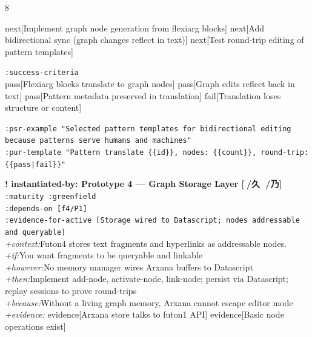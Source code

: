 \documentclass[landscape]{article}
\newcommand{\flexitag}[1]{\textcolor[gray]{0.35}{\textit{#1}}}
\newenvironment{devmapactive}{%
  \def\FrameCommand{\colorbox{devmapactivebg}}%
  \setlength{\fboxsep}{2pt}%
  \MakeFramed{\advance\hsize-\width \FrameRestore}%
}{\endMakeFramed}
\newenvironment{devmapgreenfield}{%
  \def\FrameCommand{\colorbox{devmapgreenfieldbg}}%
  \setlength{\fboxsep}{2pt}%
  \MakeFramed{\advance\hsize-\width \FrameRestore}%
}{\endMakeFramed}
\begin{document}
\begin{paracol}{8}
\begin{devmapactive}
    next[Implement graph node generation from flexiarg blocks] next[Add bidirectional sync (graph changes reflect in text)] next[Test round-trip editing of pattern templates]\\
\par
  \texttt{:\allowbreak{}success-\allowbreak{}criteria}\\
    pass[Flexiarg blocks translate to graph nodes] pass[Graph edits reflect back in text] pass[Pattern metadata preserved in translation] fail[Translation loses structure or content]\\
\par
  \texttt{:\allowbreak{}psr-\allowbreak{}example "Selected pattern templates for bidirectional editing because patterns serve humans and machines"}\\
  \texttt{:\allowbreak{}pur-\allowbreak{}template "Pattern translate \{\{id\}\},\allowbreak{} nodes:\allowbreak{} \{\{count\}\},\allowbreak{} round-\allowbreak{}trip:\allowbreak{} \{\{pass|\allowbreak{}fail\}\}"}\\
\par
\par
\end{devmapactive}
\begin{devmapgreenfield}
\textbf{! instantiated-by: Prototype 4 — Graph Storage Layer [🙅/久 👀/乃]}\\
  \texttt{:\allowbreak{}maturity :\allowbreak{}greenfield}\\
  \texttt{:\allowbreak{}depends-\allowbreak{}on [f4/\allowbreak{}P1]}\\
  \texttt{:\allowbreak{}evidence-\allowbreak{}for-\allowbreak{}active [Storage wired to Datascript;\allowbreak{} nodes addressable and queryable]}\\
  \flexitag{+context:}Futon4 stores text fragments and hyperlinks as addressable nodes.\\
  \flexitag{+if:}You want fragments to be queryable and linkable\\
  \flexitag{+however:}No memory manager wires Arxana buffers to Datascript\\
  \flexitag{+then:}Implement add-node, activate-node, link-node; persist via Datascript; replay sessions to prove round-trips\\
  \flexitag{+because:}Without a living graph memory, Arxana cannot escape editor mode\\
  \flexitag{+evidence:} evidence[Arxana store talks to futon1 API] evidence[Basic node operations exist]\\

\end{devmapgreenfield}
\end{paracol}
\end{document}

